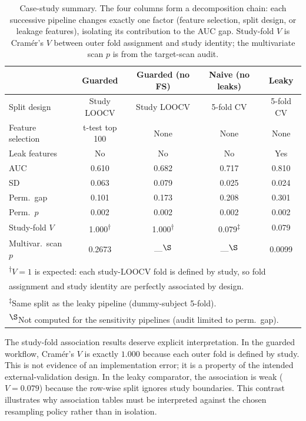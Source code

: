 \documentclass[article,shortnames]{jss}
\begin{document}
\begin{table}[tbp]
\centering
\caption{Case-study summary. The four columns form a decomposition chain:
each successive pipeline changes exactly one factor (feature selection, split
design, or leakage features), isolating its contribution to the AUC gap.
Study-fold $V$ is Cram\'er's $V$ between outer fold assignment and study
identity; the multivariate scan $p$ is from the target-scan audit.}
\label{tab:case-study}
\small
\begin{tabular}{|l|c|c|c|c|}
\hline
 & \textbf{Guarded} & \textbf{Guarded (no FS)} & \textbf{Naive (no leaks)} & \textbf{Leaky} \\
\hline
Split design & Study LOOCV & Study LOOCV & 5-fold CV & 5-fold CV \\
Feature selection & t-test top 100 & None & None & None \\
Leak features & No & No & No & Yes \\
AUC & 0.610 & 0.682 & 0.717 & 0.810 \\
SD & 0.063 & 0.079 & 0.025 & 0.024 \\
Perm.\ gap & 0.101 & 0.173 & 0.208 & 0.301 \\
Perm.\ $p$ & 0.002 & 0.002 & 0.002 & 0.002 \\
Study-fold $V$ & 1.000\textsuperscript{$\dagger$} & 1.000\textsuperscript{$\dagger$} & 0.079\textsuperscript{$\ddagger$} & 0.079 \\
Multivar.\ scan $p$ & 0.2673 & ---\textsuperscript{$\S$} & ---\textsuperscript{$\S$} & 0.0099 \\
\hline
\multicolumn{5}{l}{\footnotesize\textsuperscript{$\dagger$}$V = 1$ is expected: each study-LOOCV fold is defined by study, so fold} \\
\multicolumn{5}{l}{\footnotesize assignment and study identity are perfectly associated by design.} \\
\multicolumn{5}{l}{\footnotesize\textsuperscript{$\ddagger$}Same split as the leaky pipeline (dummy-subject 5-fold).} \\
\multicolumn{5}{l}{\footnotesize\textsuperscript{$\S$}Not computed for the sensitivity pipelines (audit limited to perm.\ gap).} \\
\end{tabular}
\end{table}

The study-fold association results deserve explicit interpretation. In the
guarded workflow, Cram\'er's $V$ is exactly $1.000$ because each outer fold is
defined by study. This is not evidence of an implementation error; it is a
property of the intended external-validation design. In the leaky comparator,
the association is weak ($V = 0.079$) because the row-wise split ignores study
boundaries. This contrast illustrates why association tables must be
interpreted against the chosen resampling policy rather than in isolation.
\end{document}
